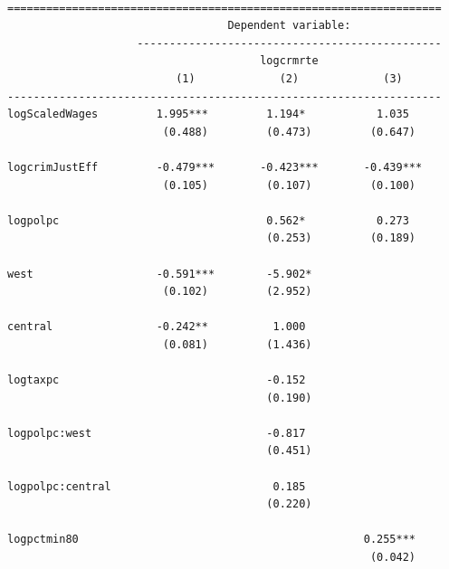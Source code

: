 \documentclass[]{article}
\begin{document}
\begin{verbatim}

===================================================================
                                  Dependent variable:              
                    -----------------------------------------------
                                       logcrmrte                   
                          (1)             (2)             (3)      
-------------------------------------------------------------------
logScaledWages         1.995***         1.194*           1.035     
                        (0.488)         (0.473)         (0.647)    
                                                                   
logcrimJustEff         -0.479***       -0.423***       -0.439***   
                        (0.105)         (0.107)         (0.100)    
                                                                   
logpolpc                                0.562*           0.273     
                                        (0.253)         (0.189)    
                                                                   
west                   -0.591***        -5.902*                    
                        (0.102)         (2.952)                    
                                                                   
central                -0.242**          1.000                     
                        (0.081)         (1.436)                    
                                                                   
logtaxpc                                -0.152                     
                                        (0.190)                    
                                                                   
logpolpc:west                           -0.817                     
                                        (0.451)                    
                                                                   
logpolpc:central                         0.185                     
                                        (0.220)                    
                                                                   
logpctmin80                                            0.255***    
                                                        (0.042)    
                                                                   

\end{verbatim}
\end{document}
